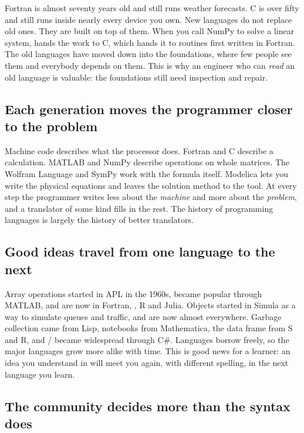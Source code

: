 Fortran is almost seventy years old and still runs weather forecasts. C is over fifty and
still runs inside nearly every device you own. New languages do not replace old ones. They
are built on top of them. When you call NumPy to solve a linear system, \py hands the work
to C, which hands it to routines first written in Fortran. The old languages have moved
down into the foundations, where few people see them and everybody depends on them. This
is why an engineer who can \emph{read} an old language is valuable: the foundations
still need inspection and repair.

\subsection*{Each generation moves the programmer closer to the problem}

Machine code describes what the processor does. Fortran and C describe a calculation.
MATLAB and NumPy describe operations on whole matrices. The Wolfram Language and SymPy
work with the formula itself. Modelica lets you write the physical equations and leaves
the solution method to the tool. At every step the programmer writes less about the
\emph{machine} and more about the \emph{problem}, and a translator of some kind fills in
the rest. The history of programming languages is largely the history of better
translators.

\subsection*{Good ideas travel from one language to the next}

Array operations started in APL in the 1960s, became popular through MATLAB, and are now
in Fortran, \py, R and Julia. Objects started in Simula as a way to simulate queues and
traffic, and are now almost everywhere. Garbage collection came from Lisp, notebooks from
Mathematica, the data frame from S and R, and / became widespread through C\#.
Languages borrow freely, so the major languages grow more alike with time. This is good
news for a learner: an idea you understand in \py will meet you again, with different
spelling, in the next language you learn.

\subsection*{The community decides more than the syntax does}


